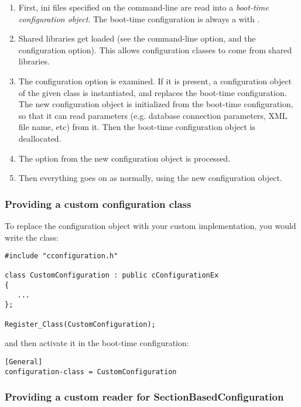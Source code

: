 \begin{enumerate}
  \item First, ini files specified on the command-line are read into a
     \textit{boot-time configuration object}. The boot-time configuration
     is always a  with
     .
  \item Shared libraries get loaded (see the  command-line option,
     and the  configuration option). This allows
     configuration classes to come from shared libraries.
  \item The  configuration option is examined.
     If it is present, a configuration object of the given class
     is instantiated, and replaces the boot-time configuration.
     The new configuration object is initialized from the boot-time
     configuration, so that it can read parameters (e.g. database
     connection parameters, XML file name, etc) from it.
     Then the boot-time configuration object is deallocated.
  \item The  option from the new configuration object is
     processed.
  \item Then everything goes on as normally, using the new configuration
     object.
\end{enumerate}

\subsubsection{Providing a custom configuration class}

To replace the configuration object with your custom implementation,
you would write the class:

\begin{verbatim}
#include "cconfiguration.h"

class CustomConfiguration : public cConfigurationEx
{
   ...
};

Register_Class(CustomConfiguration);
\end{verbatim}

and then activate it in the boot-time configuration:

\begin{verbatim}
[General]
configuration-class = CustomConfiguration
\end{verbatim}


\subsubsection{Providing a custom reader for SectionBasedConfiguration}

